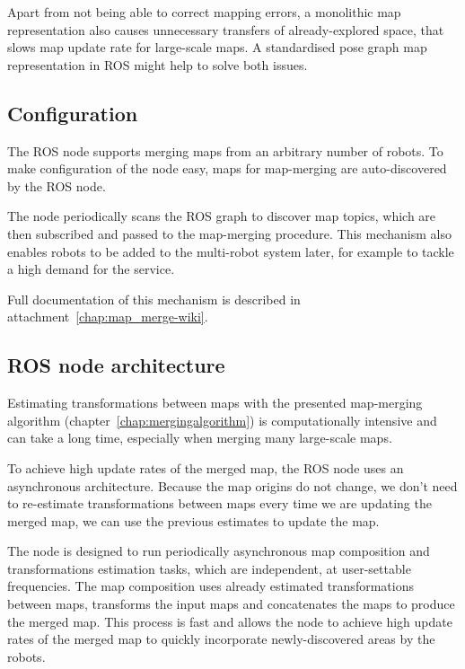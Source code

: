 Apart from not being able to correct mapping errors, a monolithic map representation also causes unnecessary transfers of already-explored space, that slows map update rate for large-scale maps. A standardised pose graph map representation in \gls{ROS} might help to solve both issues.


\subsection{Configuration}
\label{sec:configuration}

The \gls{ROS} node supports merging maps from an arbitrary number of robots. To make configuration of the node easy, maps for map-merging are auto-discovered by the \gls{ROS} node.

The node periodically scans the \gls{ROS} graph to discover map topics, which are then subscribed and passed to the map-merging procedure. This mechanism also enables robots to be added to the multi-robot system later, for example to tackle a high demand for the service.

Full documentation of this mechanism is described in attachment~\ref{chap:map_merge-wiki}.

\subsection{ROS node architecture}
\label{sec:node-architecture}

Estimating transformations between maps with the presented map-merging algorithm (chapter~\ref{chap:mergingalgorithm}) is computationally intensive and can take a long time, especially when merging many large-scale maps.

To achieve high update rates of the merged map, the \gls{ROS} node uses an asynchronous architecture. Because the map origins do not change, we don't need to re-estimate transformations between maps every time we are updating the merged map, we can use the previous estimates to update the map.

The node is designed to run periodically asynchronous map composition and transformations estimation tasks, which are independent, at user-settable frequencies. The map composition uses already estimated transformations between maps, transforms the input maps and concatenates the maps to produce the merged map. This process is fast and allows the node to achieve high update rates of the merged map to quickly incorporate newly-discovered areas by the robots.

